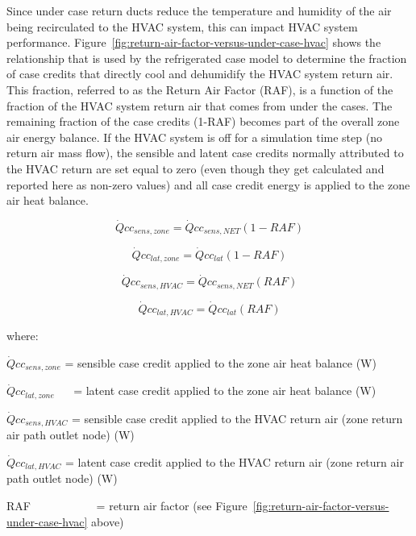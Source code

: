 Since under case return ducts reduce the temperature and humidity of the air being recirculated to the HVAC system, this can impact HVAC system performance. Figure~\ref{fig:return-air-factor-versus-under-case-hvac} shows the relationship that is used by the refrigerated case model to determine the fraction of case credits that directly cool and dehumidify the HVAC system return air. This fraction, referred to as the Return Air Factor (RAF), is a function of the fraction of the HVAC system return air that comes from under the cases. The remaining fraction of the case credits (1-RAF) becomes part of the overall zone air energy balance. If the HVAC system is off for a simulation time step (no return air mass flow), the sensible and latent case credits normally attributed to the HVAC return are set equal to zero (even though they get calculated and reported here as non-zero values) and all case credit energy is applied to the zone air heat balance.

\begin{equation}
\dot Qc{c_{sens,zone}} = \dot Qc{c_{sens,NET}}\left( {1 - RAF} \right)
\end{equation}

\begin{equation}
\dot Qc{c_{lat,zone}} = \dot Qc{c_{lat}}\left( {1 - RAF} \right)
\end{equation}

\begin{equation}
\dot Qc{c_{sens,HVAC}} = \dot Qc{c_{sens,NET}}\left( {RAF} \right)
\end{equation}

\begin{equation}
\dot Qc{c_{lat,HVAC}} = \dot Qc{c_{lat}}\left( {RAF} \right)
\end{equation}

where:

\(\dot Qc{c_{sens,zone}}\) = sensible case credit applied to the zone air heat balance (W)

\(\dot Qc{c_{lat,zone}}\) ~~ = latent case credit applied to the zone air heat balance (W)

\(\dot Qc{c_{sens,HVAC}}\) = sensible case credit applied to the HVAC return air (zone return air path outlet node) (W)

\(\dot Qc{c_{lat,HVAC}}\) = latent case credit applied to the HVAC return air (zone return air path outlet node) (W)

RAF~~~~~~~~~~~ = return air factor (see Figure~\ref{fig:return-air-factor-versus-under-case-hvac} above)

